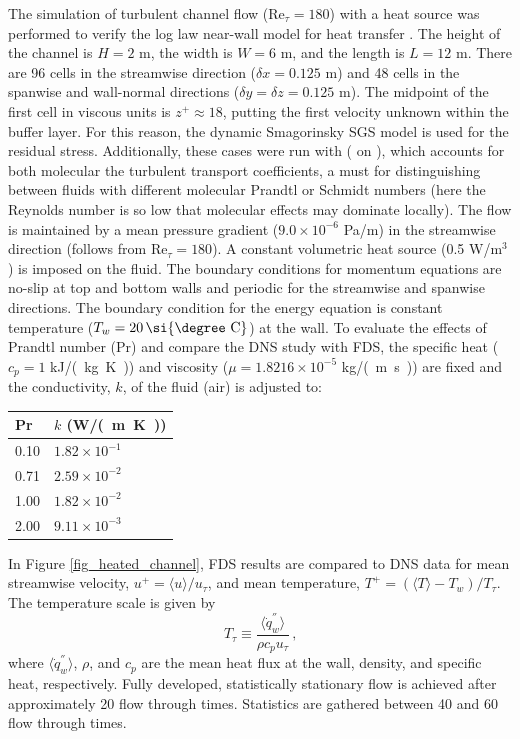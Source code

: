\documentclass[11pt]{book}
\begin{document}
The simulation of turbulent channel flow (Re$_{\tau}=180$) with a heat source was performed to verify the log law near-wall model for heat transfer \cite{FDS_Tech_Guide}. The height of the channel is $H=2$ m, the width is $W=6$ m, and the length is $L=12$ m. There are 96 cells in the streamwise direction ($\delta x = 0.125$ m) and 48 cells in the spanwise and wall-normal directions ($\delta y=\delta z=0.125$ m).  The midpoint of the first cell in viscous units is $z^+ \approx 18$, putting the first velocity unknown within the buffer layer. For this reason, the dynamic Smagorinsky SGS model is used for the residual stress. Additionally, these cases were run with ( on ), which accounts for both molecular the turbulent transport coefficients, a must for distinguishing between fluids with different molecular Prandtl or Schmidt numbers (here the Reynolds number is so low that molecular effects may dominate locally).  The flow is maintained by a mean pressure gradient ($9.0 \times 10^{-6}$ Pa/m) in the streamwise direction (follows from Re$_{\tau}=180$). A constant volumetric heat source (0.5 W/m$^3$) is imposed on the fluid. The boundary conditions for momentum equations are no-slip at top and bottom walls and periodic for the streamwise and spanwise directions. The boundary condition for the energy equation is constant temperature ($T_w = 20 \,\mbox{\si{\degree C}} $) at the wall. To evaluate the effects of Prandtl number (Pr) and compare the DNS study \cite{Kim:1987} with FDS, the specific heat ($c_p = 1$ \si{kJ/(kg.K)}) and viscosity ($\mu = 1.8216 \times 10^{-5}$ \si{kg/(m.s)}) are fixed and the conductivity, $k$, of the fluid (air) is adjusted to:
\begin{center}
\begin{tabular}{ll}
Pr & $k$ (\si{W/(m.K)}) \\
\hline
0.10 & $1.82 \times 10^{-1}$ \\
0.71 & $2.59 \times 10^{-2}$ \\
1.00 & $1.82 \times 10^{-2}$ \\
2.00 & $9.11 \times 10^{-3}$
\end{tabular}
\end{center}

In Figure \ref{fig_heated_channel}, FDS results are compared to DNS data for mean streamwise velocity, $u^+ = \langle u \rangle/u_\tau$, and mean temperature, $T^+ = (\langle T \rangle - T_w)/T_\tau$. The temperature scale is given by
\begin{equation}
\label{eqn_friction_temperature}
T_{\tau} \equiv \frac{\langle \dot{q}_w^{''} \rangle}{{\rho}{c_p}{u_{\tau}}} \,\mbox{,}
\end{equation}
where $\langle \dot{q}_w^{''} \rangle$, $\rho$, and $c_p$ are the mean heat flux at the wall, density, and specific heat, respectively.  Fully developed, statistically stationary flow is achieved after approximately 20 flow through times.  Statistics are gathered between 40 and 60 flow through times.
\end{document}
